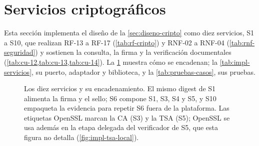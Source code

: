 
\section{Servicios criptográficos}\label{sec:impl-servicios}

Esta sección implementa el diseño de la \cref{sec:diseno-cripto} como diez servicios, S1 a S10, que realizan RF-13 a RF-17 (\cref{tab:rf-cripto}) y RNF-02 a RNF-04 (\cref{tab:rnf-seguridad}) y sostienen la consulta, la firma y la verificación documentales (\cref{tab:cu-12,tab:cu-13,tab:cu-14}). La \cref{fig:impl-servicios-panorama} muestra cómo se encadenan; la \cref{tab:impl-servicios}, su puerto, adaptador y biblioteca, y la \cref{tab:pruebas-casos}, sus pruebas.

\begin{figure}[!htbp]
  \centering
  
  \caption{Los diez servicios y su encadenamiento. El mismo digest de S1 alimenta la firma y el sello; S6 compone S1, S3, S4 y S5, y S10 empaqueta la evidencia para repetir S6 fuera de la plataforma. Las etiquetas OpenSSL marcan la CA (S3) y la TSA (S5); OpenSSL se usa además en la etapa delegada del verificador de S5, que esta figura no detalla (\cref{fig:impl-tsa-local}).}
  \label{fig:impl-servicios-panorama}
\end{figure}

